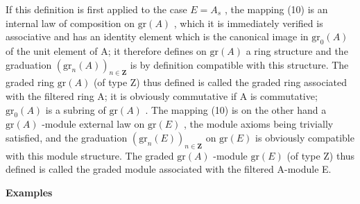 If this definition is first applied to the case \(E = A_{s}\) , the mapping (10) is an internal law of composition on \(\mathrm{gr}(A)\) , which it is immediately verified is associative and has an identity element which is the canonical image in \(\mathrm{gr}_{0}(A)\) of the unit element of A; it therefore defines on \(\mathrm{gr}(A)\) a ring structure and the graduation \((\mathrm{gr}_{n}(A))_{n\in\mathbf{Z}}\) is by definition compatible with this structure. The graded ring \(\mathrm{gr}(A)\) (of type Z) thus defined is called the graded ring associated with the filtered ring A; it is obviously commutative if A is commutative; \(\mathrm{gr}_{0}(A)\) is a subring of \(\mathrm{gr}(A)\) . The mapping (10) is on the other hand a \(\mathrm{gr}(A)\) -module external law on \(\mathrm{gr}(E)\) , the module axioms being trivially satisfied, and the graduation \((\mathrm{gr}_{n}(E))_{n\in\mathbf{Z}}\) on \(\mathrm{gr}(E)\) is obviously compatible with this module structure. The graded \(\mathrm{gr}(A)\) -module \(\mathrm{gr}(E)\) (of type Z) thus defined is called the graded module associated with the filtered A-module E.

\textbf{Examples}\par

